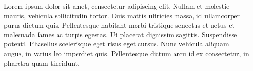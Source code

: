 

\begin{cvparagraph}
    Lorem ipsum dolor sit amet, consectetur adipiscing elit. Nullam et molestie mauris, vehicula sollicitudin tortor. Duis mattis ultricies massa, id ullamcorper purus dictum quis. Pellentesque habitant morbi tristique senectus et netus et malesuada fames ac turpis egestas. Ut placerat dignissim sagittis. Suspendisse potenti. Phasellus scelerisque eget risus eget cursus. Nunc vehicula aliquam augue, in varius leo imperdiet quis. Pellentesque dictum arcu id ex consectetur, in pharetra quam tincidunt.
\end{cvparagraph}